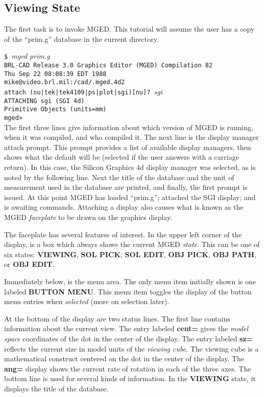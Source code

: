 \subsection{Viewing State}

The first task is to invoke MGED.  This tutorial will assume the user
has a copy of the ``prim.g'' database in the current directory.

\noindent
{\tt \$ }{\em mged prim.g}\\
{\tt BRL-CAD Release 3.0 Graphics Editor (MGED) Compilation 82}\\
{\tt Thu Sep 22 08:08:39 EDT 1988}\\
{\tt mike@video.brl.mil:/cad/.mged.4d2}\\

\noindent
{\tt attach (nu|tek|tek4109|ps|plot|sgi)[nu]? }{\em sgi}\\
{\tt ATTACHING sgi (SGI 4d)}\\
{\tt Primitive Objects (units=mm)}\\
{\tt mged> }\\

The first three lines give information about which version of MGED is running,
when it was compiled, and who compiled it.  The next line is the display
manager attach prompt.  This prompt provides a list of available display
managers, then shows what the default will be (selected if the user answers
with a carriage return).  In this case, the Silicon Graphics 4d display
manager was selected, as is noted by the following line.
Next the title of the database and
the unit of measurement used in the database are printed,
and finally, the first prompt is issued.
At this point MGED has loaded ``prim.g''; attached the SGI display;
and is awaiting commands.  Attaching a display also causes what
is known as the MGED {\sl faceplate} to be drawn on the graphics display.

The faceplate has several features of interest.  In the upper left corner
of the display, is a box which always shows the current MGED {\sl state}.
This can be one of six states:  {\bf VIEWING}, {\bf SOL PICK},
{\bf SOL EDIT}, {\bf OBJ PICK}, {\bf OBJ PATH}, or {\bf OBJ EDIT}.

Immediately below, is the menu area.  The only menu item initially shown is
one labeled {\bf BUTTON MENU}.  This menu item toggles the display of the
button menu entries when {\sl selected} (more on selection later).

At the bottom of the display are two status lines.  The first line
contains information about the current view.
The entry labeled {\bf cent=} gives the {\sl model space} coordinates
of the dot in the center of the display.
The entry labeled {\bf sz=} reflects the current size in model units of
the {\sl viewing cube}.  The viewing cube is a mathematical construct
centered on the dot in the center of the display.  The {\bf ang=}
display shows the current rate of rotation in each of the three axes.
The bottom line is used for several kinds of information.
In the {\bf VIEWING} state, it displays the title of the database.

